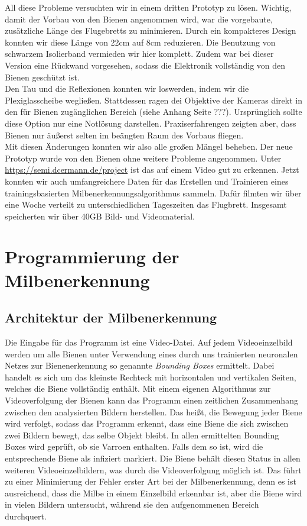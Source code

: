 \documentclass[11pt,a4paper]{article}
\begin{document}
All diese Probleme versuchten wir in einem dritten Prototyp zu lösen. Wichtig, damit der Vorbau von den Bienen angenommen wird, war die vorgebaute, zusätzliche Länge des Flugebretts zu minimieren. Durch ein kompakteres Design konnten wir diese Länge von 22cm auf 8cm reduzieren. Die Benutzung von schwarzem Isolierband vermieden wir hier komplett. Zudem war bei dieser Version eine Rückwand vorgesehen, sodass die Elektronik vollständig von den Bienen geschützt ist.\\
Den Tau und die Reflexionen konnten wir loswerden, indem wir die Plexiglasscheibe wegließen. Stattdessen ragen dei Objektive der Kameras direkt in den für Bienen zugänglichen Bereich (siehe Anhang Seite ???). Ursprünglich sollte diese Option nur eine Notlösung darstellen. Praxiserfahrengen zeigten aber, dass Bienen nur äußerst selten im beängten Raum des Vorbaus fliegen.\\
Mit diesen Änderungen konnten wir also alle großen Mängel beheben. Der neue Prototyp wurde von den Bienen ohne weitere Probleme angenommen. Unter \url{https://semi.dcermann.de/project} ist das auf einem Video gut zu erkennen. Jetzt konnten wir auch umfangreichere Daten für das Erstellen und Trainieren eines trainingsbasierten Milbenerkennungsalgorithmus sammeln. Dafür filmten wir über eine Woche verteilt zu unterschiedlichen Tageszeiten das Flugbrett. Insgesamt speicherten wir über 40GB Bild- und Videomaterial.\\


\newpage
\section{Programmierung der Milbenerkennung} \label{section:Programmierung}
\subsection{Architektur der Milbenerkennung}
Die Eingabe für das Programm ist eine Video-Datei. Auf jedem Videoeinzelbild werden um alle Bienen unter Verwendung eines durch uns trainierten neuronalen Netzes zur Bienenerkennung so genannte \textit{Bounding Boxes} ermittelt. Dabei handelt es sich um das kleinste Rechteck mit horizontalen und vertikalen Seiten, welches die Biene vollständig enthält. Mit einem eigenen Algorithmus zur Videoverfolgung der Bienen kann das Programm einen zeitlichen Zusammenhang zwischen den analysierten Bildern herstellen. Das heißt, die Bewegung jeder Biene wird verfolgt, sodass das Programm erkennt, dass eine Biene die sich zwischen zwei Bildern bewegt, das selbe Objekt bleibt. In allen ermittelten Bounding Boxes wird geprüft, ob sie Varroen enthalten. Falls dem so ist, wird die entsprechende Biene als infiziert markiert. Die Biene behält diesen Status in allen weiteren Videoeinzelbildern, was durch die Videoverfolgung möglich ist. Das führt zu einer Minimierung der Fehler erster Art bei der Milbenerkennung, denn es ist ausreichend, dass die Milbe in einem Einzelbild erkennbar ist, aber die Biene wird in vielen Bildern untersucht, während sie den aufgenommenen Bereich durchquert.
\end{document}

